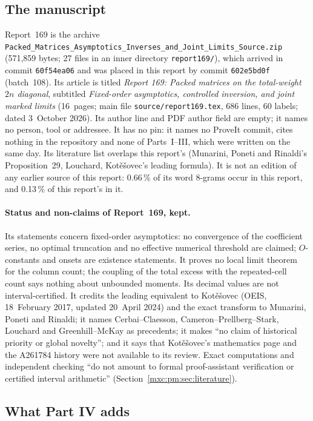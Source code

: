 \documentclass[11pt]{article}
\numberwithin{equation}{section}
\theoremstyle{definition}
\theoremstyle{remark}
\begin{document}
\subsection{The manuscript}
Report~169 is the archive
\nolinkurl{Packed_Matrices_Asymptotics_Inverses_and_Joint_Limits_Source.zip}
(571,859 bytes; 27 files in an inner directory \texttt{report169/}), which
arrived in commit \texttt{60f54ea06} and was placed in this report by commit
\texttt{602e5bd0f} (batch~108). Its article is titled \emph{Report 169:
Packed matrices on the total-weight $2n$ diagonal}, subtitled
\emph{Fixed-order asymptotics, controlled inversion, and joint marked
limits} (16~pages; main file \texttt{source/report169.tex}, 686 lines,
60 labels; dated 3~October 2026). Its author line and PDF author field are
empty; it names no person, tool or addressee. It has no pin: it names no
ProveIt commit, cites nothing in the repository and none of Parts~I--III,
which were written on the same day. Its literature list overlaps this
report's (Munarini, Poneti and Rinaldi's Proposition~29, Louchard,
Kot\v{e}\v{s}ovec's leading formula). It is not an edition of any earlier
source of this report: 0.66\,\% of its word 8-grams occur in this report,
and 0.13\,\% of this report's in it.

\paragraph{Status and non-claims of Report~169, kept.} Its statements
concern fixed-order asymptotics: no convergence of the coefficient series,
no optimal truncation and no effective numerical threshold are claimed;
$O$-constants and onsets are existence statements. It proves no local limit
theorem for the column count; the coupling of the total excess with the
repeated-cell count says nothing about unbounded moments. Its decimal values
are not interval-certified. It credits the leading equivalent to
Kot\v{e}\v{s}ovec (OEIS, 18~February 2017, updated 20~April 2024) and the
exact transform to Munarini, Poneti and Rinaldi; it names Cerbai--Claesson,
Cameron--Prellberg--Stark, Louchard and Greenhill--McKay as precedents; it
makes ``no claim of historical priority or global novelty''; and it says
that Kot\v{e}\v{s}ovec's mathematics page and the A261784 history were not
available to its review. Exact computations and independent checking ``do
not amount to formal proof-assistant verification or certified interval
arithmetic'' (Section~\ref{mxc:pm:sec:literature}).

\subsection{What Part IV adds}
\end{document}
